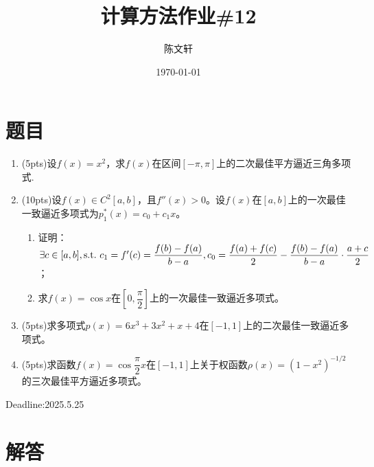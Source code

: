 \documentclass[cn,hazy,green,11pt,normal]{elegantnote}
\title{计算方法作业\#12}
\author{陈文轩}
\institute{KFRC}
\date{\today}
\begin{document}
\maketitle

\section{题目}


\begin{enumerate}

    \item (5pts)设$f(x)=x^2$，求$f(x)$在区间$[-\pi,\pi]$上的二次最佳平方逼近三角多项式.

    \item (10pts)设$f(x)\in C^2[a,b]$，且$f''(x)>0$。设$f(x)$在$[a,b]$上的一次最佳一致逼近多项式为$p_1^*(x)=c_0+c_1 x$。
        \begin{enumerate}
            \item 证明：$\exists c\in[a,b],\text{s.t.\,\,} c_1=f'(c)=\dfrac{f(b)-f(a)}{b-a},c_0=\dfrac{f(a)+f(c)}{2}-\dfrac{f(b)-f(a)}{b-a}\cdot\dfrac{a+c}{2}$；
            \item 求$f(x)=\cos x$在$\left[0,\dfrac{\pi}{2}\right]$上的一次最佳一致逼近多项式。
        \end{enumerate}

    \item (5pts)求多项式$p(x)=6x^3+3x^2+x+4$在$[-1,1]$上的二次最佳一致逼近多项式。

    \item (5pts)求函数$f(x)=\cos \dfrac{\pi}{2}x$在$[-1,1]$上关于权函数$\rho(x)=(1-x^2)^{-1/2}$的三次最佳平方逼近多项式。
\end{enumerate}

    Deadline:2025.5.25

\section{解答}
\end{document}
